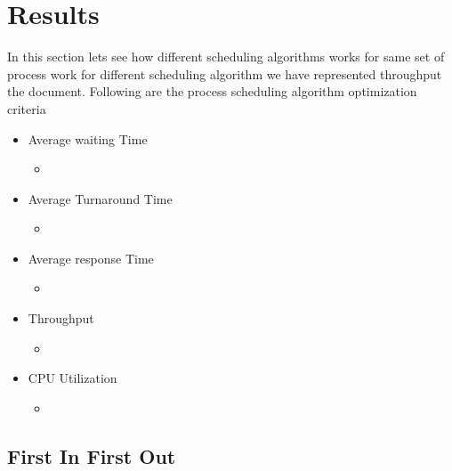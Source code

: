 \documentclass{article}
\begin{document}
\section{Results}
In this section lets see how different scheduling algorithms works for same set of process work for different scheduling algorithm we have represented throughput the document.
Following are the process scheduling algorithm optimization criteria 
\begin{itemize}
    \item Average waiting Time
        \begin{itemize}[label= ]
            \item
        \end{itemize}
    \item Average Turnaround Time
    \begin{itemize}[label= ]
        \item
    \end{itemize}
    \item Average response Time
    \begin{itemize}[label= ]
        \item
    \end{itemize}
    \item Throughput
    \begin{itemize}[label= ]
        \item
    \end{itemize}
    \item CPU Utilization
    \begin{itemize}[label= ]
        \item
    \end{itemize}
\end{itemize}

\vspace{\baselineskip}
\subsection{First In First Out}

\vspace{\baselineskip}
\hspace{1cm}
\end{document}
